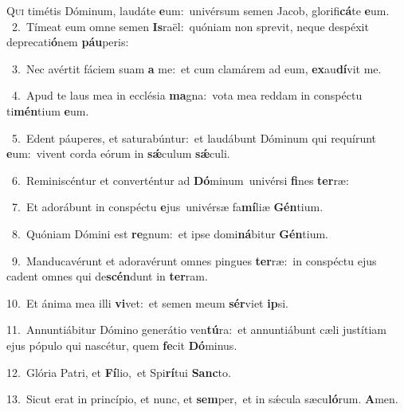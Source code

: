 \lettrine{\initial\textcolor{\initialcolor}{Q}}{ui} timétis Dóminum, laudáte \textbf{e}\-um:~\star univérsum semen Jacob, glorifi\-\textbf{cá}\-te \textbf{e}\-um.\\
{\numbfont\textcolor{\numbcolor}{~2.}}~Tímeat eum omne semen \textbf{Is}\-raël:~\star quóniam non sprevit, neque despéxit deprecati\-\textbf{ó}\-nem \textbf{páu}\-peris:\par
{\numbfont\textcolor{\numbcolor}{~3.}}~Nec avértit fáciem suam \textbf{a} me:~\star et cum clamárem ad eum, \textbf{ex}\-au\-\textbf{dí}\-vit me.\par
{\numbfont\textcolor{\numbcolor}{~4.}}~Apud te laus mea in ecclésia \textbf{ma}\-gna:~\star vota mea reddam in conspéctu ti\-\textbf{mén}\-tium \textbf{e}\-um.\par
{\numbfont\textcolor{\numbcolor}{~5.}}~Edent páuperes, et saturabúntur:~\dagger et laudábunt Dóminum qui requírunt \textbf{e}\-um:~\star vivent corda eórum in \textbf{sǽ}\-culum \textbf{sǽ}\-culi.\par
{\numbfont\textcolor{\numbcolor}{~6.}}~Reminiscéntur et converténtur ad \textbf{Dó}\-minum~\star univérsi \textbf{fi}\-nes \textbf{ter}\-ræ:\par
{\numbfont\textcolor{\numbcolor}{~7.}}~Et adorábunt in conspéctu \textbf{e}\-jus~\star univérsæ fa\-\textbf{mí}\-liæ \textbf{Gén}\-tium.\par
{\numbfont\textcolor{\numbcolor}{~8.}}~Quóniam Dómini est \textbf{re}\-gnum:~\star et ipse domi\-\textbf{ná}\-bitur \textbf{Gén}\-tium.\par
{\numbfont\textcolor{\numbcolor}{~9.}}~Manducavérunt et adoravérunt omnes pingues \textbf{ter}\-ræ:~\star in conspéctu ejus cadent omnes qui de\-\textbf{scén}\-dunt in \textbf{ter}\-ram.\par
{\numbfont\textcolor{\numbcolor}{10.}}~Et ánima mea illi \textbf{vi}\-vet:~\star et semen meum \textbf{sér}\-viet \textbf{ip}\-si.\par
{\numbfont\textcolor{\numbcolor}{11.}}~Annuntiábitur Dómino generátio ven\-\textbf{tú}\-ra:~\star et annuntiábunt cæli justítiam ejus pópulo qui nascétur, quem \textbf{fe}\-cit \textbf{Dó}\-minus.\par
{\numbfont\textcolor{\numbcolor}{12.}}~Glória Patri, et \textbf{Fí}\-lio,~\star et Spi\-\textbf{rí}\-tui \textbf{Sanc}\-to.\par
{\numbfont\textcolor{\numbcolor}{13.}}~Sicut erat in princípio, et nunc, et \textbf{sem}\-per,~\star et in sǽcula sæcu\-\textbf{ló}\-rum. \textbf{A}\-men.\par
